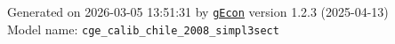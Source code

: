 \documentclass[10pt,a4paper]{article}
\numberwithin{equation}{section}
\begin{document}
\begin{landscape}
\begin{flushleft}{\large
Generated  on 2026-03-05 13:51:31 by \href{http://gecon.r-forge.r-project.org/}{\texttt{gEcon}} version 1.2.3 (2025-04-13)\\
Model name: \verb+cge_calib_chile_2008_simpl3sect+
}\end{flushleft}


\end{landscape}

\end{document}
